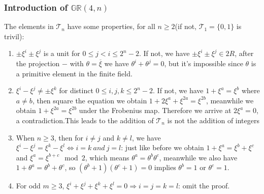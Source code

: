 \documentclass[
    aspectratio=169,                   %
]{beamer}
\newcommand{\GR}{\mathbb{GR}}
\begin{document}
    \begin{frame}
        \frametitle{Introduction of $ \GR(4,n) $}
    
            The elements in $ \mathcal{T}_n $ have some properties, for all $ n\geq 2 $(if not, $ \mathcal{T}_1=\{0,1\} $ is trivil):
            \begin{enumerate} 
                \item $ \pm\xi^i\pm\xi^j $ is a unit for $ 0\leq j< i\leq 2^n-2 $. If not, we have $ \pm\xi^i\pm\xi^j\in 2R $, after the projection $ - $ with $ \theta=\overline{\xi} $ we have $ \theta^i+\theta^j=0 $, but it's impossible since $ \theta $ is a primitive element in the finite field.
                \item $ \xi^i-\xi^j\neq\pm\xi^k $ for distinct $ 0\leq i,j,k\leq 2^n-2 $. If not, we have $ 1+\xi^a=\xi^{b} $ where $ a\neq b $, then square the equation we obtain $ 1+2\xi^a+\xi^{2a}=\xi^{2b} $, meanwhile we obtain $ 1+\xi^{2a}=\xi^{2b} $ under the Frobenius map. Therefore we arrive at $ 2\xi^{a}=0 $, a contradiction.{This leads to the addition of $ \mathcal{T}_n $ is not the addition of integers}
                \item When $ n\geq 3 $, then for $ i\neq j $ and $ k\neq l $, we have $ \xi^i-\xi^j=\xi^k-\xi^l\Leftrightarrow i=k~and~j=l $: just like before we obtain $ 1+\xi^a=\xi^b+\xi^c $ and $ \xi^a=\xi^{b+c}\mod{2} $, which means $ \theta^a=\theta^b\theta^c $, meanwhile we also have $ 1+\theta^a=\theta^b+\theta^c $, so $ (\theta^b+1)(\theta^c+1)=0 $ implies $ \theta^b=1 $ or $ \theta^c=1 $.
                \item For odd $ m\geq 3 $, $ \xi^i+\xi^j+\xi^k+\xi^l=0\Rightarrow i=j=k=l $: omit the proof.
                
            \end{enumerate}
    
   
    
    
    \end{frame}
\end{document}
